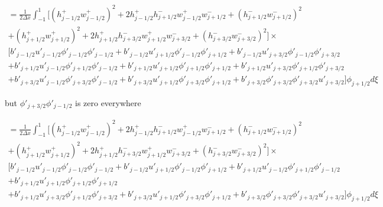 \documentclass[12pt]{article}
\begin{document}
\begin{multline}
= \frac{1}{2\Delta x}\int_{-1}^{1} \bigg[\left(h^+_{j-1/2} w^+_{j-1/2}\right)^2 + 2h^+_{j-1/2}h^-_{j+1/2} w^+_{j-1/2} w^-_{j+1/2} + \left(h^-_{j+1/2} w^-_{j+1/2}\right)^2  \\+ \left(h^+_{j+1/2} w^+_{j+1/2}\right)^2 + 2h^+_{j+1/2}h^-_{j+3/2} w^+_{j+1/2} w^-_{j+3/2} + \left(h^-_{j+3/2} w^-_{j+3/2}\right)^2\bigg] \times \\
\bigg[b'_{j-1/2}u'_{j-1/2} \phi'_{j-1/2} \phi'_{j-1/2} + b'_{j-1/2}u'_{j+1/2} \phi'_{j-1/2} \phi'_{j+1/2}  +  b'_{j-1/2}u'_{j+3/2}  \phi'_{j-1/2} \phi'_{j+3/2} \\+ b'_{j+1/2} u'_{j-1/2}\phi'_{j+1/2} \phi'_{j-1/2} + b'_{j+1/2}u'_{j+1/2} \phi'_{j+1/2} \phi'_{j+1/2} +  b'_{j+1/2}u'_{j+3/2} \phi'_{j+1/2} \phi'_{j+3/2} \\+  b'_{j+3/2}u'_{j-1/2} \phi'_{j+3/2}  \phi'_{j-1/2} +   b'_{j+3/2} u'_{j+1/2} \phi'_{j+3/2} \phi'_{j+1/2} +  b'_{j+3/2}\phi'_{j+3/2}  \phi'_{j+3/2} u'_{j+3/2}   \bigg] \phi_{j+1/2} d\xi
\end{multline}

but $\phi'_{j+3/2}  \phi'_{j-1/2}$ is zero everywhere


\begin{multline}
= \frac{1}{2\Delta x}\int_{-1}^{1} \bigg[\left(h^+_{j-1/2} w^+_{j-1/2}\right)^2 + 2h^+_{j-1/2}h^-_{j+1/2} w^+_{j-1/2} w^-_{j+1/2} + \left(h^-_{j+1/2} w^-_{j+1/2}\right)^2  \\+ \left(h^+_{j+1/2} w^+_{j+1/2}\right)^2 + 2h^+_{j+1/2}h^-_{j+3/2} w^+_{j+1/2} w^-_{j+3/2} + \left(h^-_{j+3/2} w^-_{j+3/2}\right)^2\bigg] \times \\
\bigg[b'_{j-1/2}u'_{j-1/2} \phi'_{j-1/2} \phi'_{j-1/2} + b'_{j-1/2}u'_{j+1/2} \phi'_{j-1/2} \phi'_{j+1/2}  + b'_{j+1/2} u'_{j-1/2}\phi'_{j+1/2} \phi'_{j-1/2} \\+ b'_{j+1/2}u'_{j+1/2} \phi'_{j+1/2} \phi'_{j+1/2} \\ +   b'_{j+1/2}u'_{j+3/2} \phi'_{j+1/2} \phi'_{j+3/2} +   b'_{j+3/2} u'_{j+1/2} \phi'_{j+3/2} \phi'_{j+1/2} +  b'_{j+3/2}\phi'_{j+3/2}  \phi'_{j+3/2} u'_{j+3/2}   \bigg] \phi_{j+1/2} d\xi
\end{multline}
\end{document}
